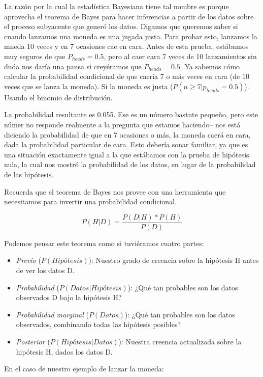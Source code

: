 \documentclass[
  12pt,
]{book}
\providecommand{\tightlist}{%
  \setlength{\itemsep}{0pt}\setlength{\parskip}{0pt}}
\theoremstyle{definition}
\theoremstyle{definition}
\theoremstyle{definition}
\theoremstyle{remark}
\begin{document}
La razón por la cual la estadística Bayesiana tiene tal nombre es porque aprovecha el teorema de Bayes para hacer inferencias a partir de los datos sobre el proceso subyacente que generó los datos. Digamos que queremos saber si cuando lanzamos una moneda es una jugada justa. Para probar esto, lanzamos la mneda 10 veces y en 7 ocasiones cae en cara. Antes de esta prueba, estábamos muy seguros de que \(P_{heads}=0.5\), pero al caer cara 7 veces de 10 lanzamientos sin duda nos daría una pausa si creyéramos que \(P_{heads}=0.5\). Ya sabemos cómo calcular la probabilidad condicional de que caería 7 o más veces en cara (de 10 veces que se lanza la moneda). Si la moneda es justa (\(P(n\ge7|p_{heads}=0.5)\)). Usando el binomio de distribución.

La probabilidad resultante es 0.055. Ese es un número bastnte pequeño, pero este númer no responde realmente a la pregunta que estamos haciendo-- nos está diciendo la probabilidad de que en 7 ocasiones o más, la moneda caerá en cara, dada la probabilidad particular de cara. Esto debería sonar familiar, ya que es una situación exactamente igual a la que estábamos con la prueba de hipótesis nula, la cual nos mostró la probabilidad de los datos, en lugar de la probabilidad de las hipótesis.

Recuerda que el teorema de Bayes nos provee con una herramienta que necesitamos para invertir una probabilidad condicional.

\[
P(H|D) = \frac{P(D|H)*P(H)}{P(D)}
\]

Podemos pensar este teorema como si tuviéramos cuatro partes:

\begin{itemize}
\tightlist
\item
  \emph{Previo} (\(P(Hipótesis)\)): Nuestro grado de creencia sobre la hipótesis H antes de ver los datos D.
\item
  \emph{Probabilidad} (\(P(Datos|Hipótesis)\)): ¿Qué tan probables son los datos observados D bajo la hipótesis H?
\item
  \emph{Probabilidad marginal} (\(P(Datos)\)): ¿Qué tan probables son los datos observados, combinando todas las hipótesis posibles?
\item
  \emph{Posterior} (\(P(Hipótesis|Datos)\)): Nuestra creencia actualizada sobre la hipótesis H, dados los datos D.
\end{itemize}

En el caso de nuestro ejemplo de lanzar la moneda:
\end{document}
